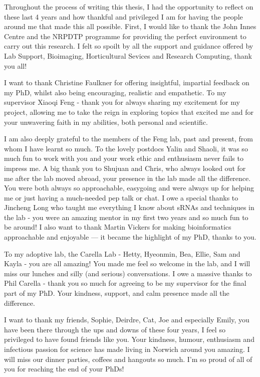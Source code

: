 
\begin{acknowledgements}      

Throughout the process of writing this thesis, I had the opportunity to reflect on these last 4 years and how thankful and privileged I am for having the people around me that made this all possible. First, I would like to thank the John Innes Centre and the NRPDTP programme for providing the perfect environment to carry out this research. I felt so spoilt by all the support and guidance offered by Lab Support, Bioimaging, Horticultural Sevices and Research Computing, thank you all!

I want to thank Christine Faulkner for offering insightful, impartial feedback on my PhD, whilst also being encouraging, realistic and empathetic. To my supervisor Xiaoqi Feng - thank you for always sharing my excitement for my project, allowing me to take the reign in exploring topics that excited me and for your unwavering faith in my abilities, both personal and scientific. 

I am also deeply grateful to the members of the Feng lab, past and present, from whom I have learnt so much. To the lovely postdocs Yalin and Shaoli, it was so much fun to work with you and your work ethic and enthusiasm never fails to impress me. A big thank you to Shujuan and Chris, who always looked out for me after the lab moved abroad, your presence in the lab made all the difference. You were both always so approachable, easygoing and were always up for helping me or just having a much-needed pep talk or chat. I owe a special thanks to Jincheng Long who taught me everything I know about sRNAs and techniques in the lab - you were an amazing mentor in my first two years and so much fun to be around!  I also want to thank Martin Vickers for making bioinformatics approachable and enjoyable — it became the highlight of my PhD, thanks to you.

To my adoptive lab, the Carella Lab -  Hetty, Hyeonmin, Bea, Ellie, Sam and Kayla - you are all amazing! You made me feel so welcome in the lab, and I will miss our lunches and silly (and serious) conversations. I owe a massive thanks to Phil Carella - thank you so much for agreeing to be my supervisor for the final part of my PhD. Your kindness, support, and calm presence made all the difference.

I want to thank my friends, Sophie, Deirdre, Cat, Joe and especially Emily, you have been there through the ups and downs of these four years, I feel so privileged to have found friends like you. Your kindness, humour, enthusiasm and infectious passion for science has made living in Norwich around you amazing. I will miss our dinner parties, coffees and hangouts so much. I’m so proud of all of you for reaching the end of your PhDs!


\end{acknowledgements}
